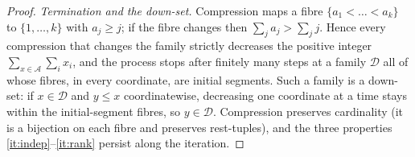 \documentclass[11pt,a4paper]{article}
\theoremstyle{plain}
\theoremstyle{definition}
\theoremstyle{remark}
\newcommand{\cA}{\mathcal A}
\newcommand{\cD}{\mathcal D}
\begin{document}
\begin{proof}
\emph{Termination and the down-set.} Compression maps a fibre $\{a_1<\dots<a_k\}$ to $\{1,\dots,k\}$ with $a_j\ge j$; if the fibre changes then $\sum_ja_j>\sum_jj$. Hence every compression that changes the family strictly decreases the positive integer $\sum_{x\in\cA}\sum_ix_i$, and the process stops after finitely many steps at a family $\cD$ all of whose fibres, in every coordinate, are initial segments. Such a family is a down-set: if $x\in\cD$ and $y\le x$ coordinatewise, decreasing one coordinate at a time stays within the initial-segment fibres, so $y\in\cD$. Compression preserves cardinality (it is a bijection on each fibre and preserves rest-tuples), and the three properties \ref{it:indep}--\ref{it:rank} persist along the iteration.
\end{proof}

\label{pf:defect}
\lemdefect*
\end{document}
